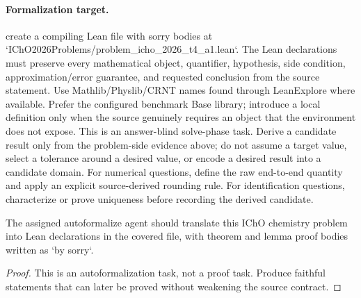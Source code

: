 \paragraph{Formalization target.}
create a compiling Lean file with sorry bodies at `IChO2026Problems/problem\_icho\_2026\_t4\_a1.lean`.
The Lean declarations must preserve every mathematical object, quantifier, hypothesis, side condition, approximation/error guarantee, and requested conclusion from the source statement.
Use Mathlib/Physlib/CRNT names found through LeanExplore where available. Prefer the configured benchmark Base library; introduce a local definition only when the source genuinely requires an object that the environment does not expose.
This is an answer-blind solve-phase task. Derive a candidate result only from the problem-side evidence above; do not assume a target value, select a tolerance around a desired value, or encode a desired result into a candidate domain.
For numerical questions, define the raw end-to-end quantity and apply an explicit source-derived rounding rule. For identification questions, characterize or prove uniqueness before recording the derived candidate.

\begin{theorem}
\label{thm:physics:icho_2026_t4_a1:target}
The assigned autoformalize agent should translate this IChO chemistry problem into Lean declarations in the covered file, with theorem and lemma proof bodies written as `by sorry`.
\end{theorem}
\begin{proof}
This is an autoformalization task, not a proof task. Produce faithful statements that can later be proved without weakening the source contract.
\end{proof}
